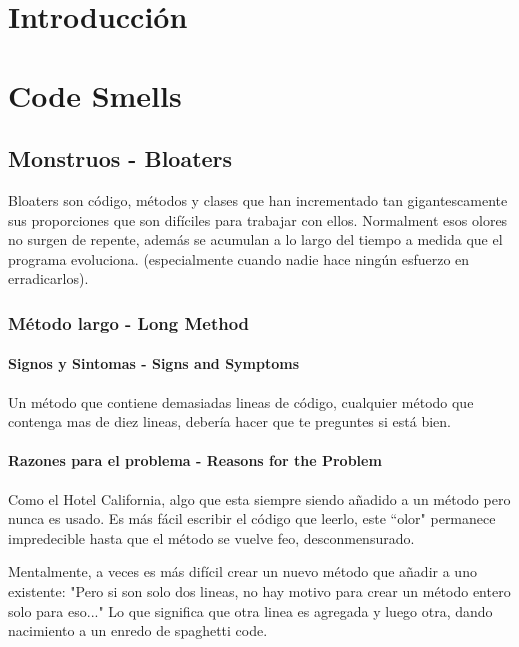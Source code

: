 \documentclass[11pt,a4paper,oneside]{book}
\begin{document}
 
\chapter{Introducción}

\chapter{Code Smells}

\section{Monstruos - Bloaters}
\label{bloaters}
Bloaters son código, métodos y clases que han incrementado tan gigantescamente sus proporciones que son difíciles para trabajar con ellos. Normalment esos olores no surgen de repente, además se acumulan a lo largo del tiempo a medida que el programa evoluciona. (especialmente cuando nadie hace ningún esfuerzo en erradicarlos).

\subsection{Método largo -   Long Method}
\label{metodolargo}
\subsubsection{Signos y Sintomas - Signs and Symptoms}

Un método que contiene demasiadas lineas de código, cualquier método que contenga mas de diez lineas, debería hacer que te preguntes si está bien.



\subsubsection{Razones para el problema - Reasons for the Problem}

Como el Hotel California, algo que esta siempre siendo añadido a un método pero nunca es usado. Es más fácil escribir el código que leerlo, este ``olor" permanece impredecible hasta que el método se vuelve feo, desconmensurado. 

Mentalmente, a veces es más difícil crear un nuevo método que añadir a uno existente: "Pero si son solo dos lineas, no hay motivo para crear un método entero solo para eso..." Lo que significa que otra linea es agregada y luego otra, dando nacimiento a un enredo de spaghetti code. 
\end{document}
